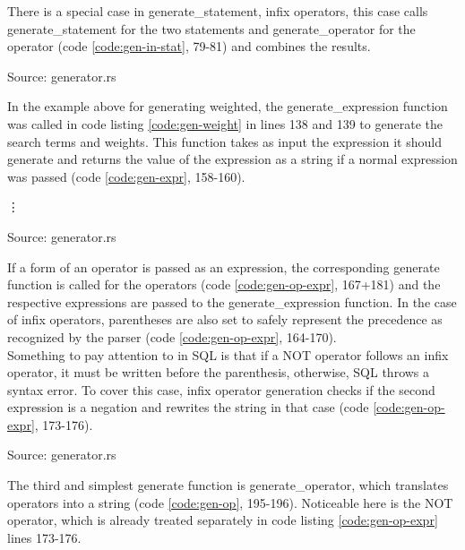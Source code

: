There is a special case in generate\_statement, infix operators, this case calls generate\_statement for the two statements and generate\_operator for the operator (code \ref{code:gen-in-stat}, 79-81) and combines the results.
\begin{codeenv}
    \label{code:gen-in-stat}
    
    \centerline{Source: generator.rs}
\end{codeenv}
In the example above for generating weighted, the generate\_expression function was called in code listing \ref{code:gen-weight} in lines 138 and 139 to generate the search terms and weights. This function takes as input the expression it should generate and returns the value of the expression as a string if a normal expression was passed (code \ref{code:gen-expr}, 158-160).
\begin{codeenv}
    \label{code:gen-expr}
    
    \vdots
    
    \centerline{Source: generator.rs}
\end{codeenv}
If a form of an operator is passed as an expression, the corresponding generate function is called for the operators (code \ref{code:gen-op-expr}, 167+181) and the respective expressions are passed to the generate\_expression function. In the case of infix operators, parentheses are also set to safely represent the precedence as recognized by the parser (code \ref{code:gen-op-expr}, 164-170).\\
Something to pay attention to in \ac{SQL} is that if a NOT operator follows an infix operator, it must be written before the parenthesis, otherwise, \ac{SQL} throws a syntax error. To cover this case, infix operator generation checks if the second expression is a negation and rewrites the string in that case (code \ref{code:gen-op-expr}, 173-176).
\begin{codeenv}
    \label{code:gen-op-expr}
    
    \centerline{Source: generator.rs}
\end{codeenv}
The third and simplest generate function is generate\_operator, which translates operators into a string (code \ref{code:gen-op}, 195-196). Noticeable here is the NOT operator, which is already treated separately in code listing \ref{code:gen-op-expr} lines 173-176.
